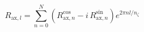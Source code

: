 \documentclass[a4paper, 12pt]{article}
\begin{document}
\begin{equation*}
   R_{\mathrm{ax}, l}
 = \sum\limits_{n=0}^{N}
     \left( R_{\mathrm{ax}, n}^\mathrm{cos} - i \, R_{\mathrm{ax}, n}^\mathrm{sin} \right)
     e^{2 \pi n l / n_\zeta}
\end{equation*}
\end{document}
